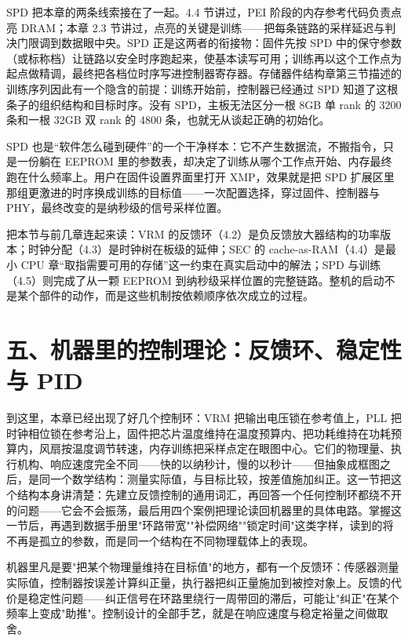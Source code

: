 SPD 把本章的两条线索接在了一起。4.4 节讲过，PEI 阶段的内存参考代码负责点亮 DRAM；本章 2.3 节讲过，点亮的关键是训练——把每条链路的采样延迟与判决门限调到数据眼中央。SPD 正是这两者的衔接物：固件先按 SPD 中的保守参数（或标称档）让链路以安全时序跑起来，使基本读写可用；训练再以这个工作点为起点做精调，最终把各档位时序写进控制器寄存器。存储器件结构章第三节描述的训练序列因此有一个隐含的前提：训练开始前，控制器已经通过 SPD 知道了这根条子的组织结构和目标时序。没有 SPD，主板无法区分一根 8GB 单 rank 的 3200 条和一根 32GB 双 rank 的 4800 条，也就无从谈起正确的初始化。

SPD 也是“软件怎么碰到硬件”的一个干净样本：它不产生数据流，不搬指令，只是一份躺在 EEPROM 里的参数表，却决定了训练从哪个工作点开始、内存最终跑在什么频率上。用户在固件设置界面里打开 XMP，效果就是把 SPD 扩展区里那组更激进的时序换成训练的目标值——一次配置选择，穿过固件、控制器与 PHY，最终改变的是纳秒级的信号采样位置。

\begin{classicnote}
把本节与前几章连起来读：VRM 的反馈环（4.2）是负反馈放大器结构的功率版本；时钟分配（4.3）是时钟树在板级的延伸；SEC 的 cache-as-RAM（4.4）是最小 CPU 章“取指需要可用的存储”这一约束在真实启动中的解法；SPD 与训练（4.5）则完成了从一颗 EEPROM 到纳秒级采样位置的完整链路。整机的启动不是某个部件的动作，而是这些机制按依赖顺序依次成立的过程。
\end{classicnote}
\section{五、机器里的控制理论：反馈环、稳定性与 PID}

到这里，本章已经出现了好几个控制环：VRM 把输出电压锁在参考值上，PLL 把时钟相位锁在参考沿上，固件把芯片温度维持在温度预算内、把功耗维持在功耗预算内，风扇按温度调节转速，内存训练把采样点定在眼图中心。它们的物理量、执行机构、响应速度完全不同——快的以纳秒计，慢的以秒计——但抽象成框图之后，是同一个数学结构：测量实际值，与目标比较，按差值施加纠正。这一节把这个结构本身讲清楚：先建立反馈控制的通用词汇，再回答一个任何控制环都绕不开的问题——它会不会振荡，最后用四个案例把理论读回机器里的具体电路。掌握这一节后，再遇到数据手册里"环路带宽""补偿网络""锁定时间"这类字样，读到的将不再是孤立的参数，而是同一个结构在不同物理载体上的表现。

\begin{keyidea}
机器里凡是要"把某个物理量维持在目标值"的地方，都有一个反馈环：传感器测量实际值，控制器按误差计算纠正量，执行器把纠正量施加到被控对象上。反馈的代价是稳定性问题——纠正信号在环路里绕行一周带回的滞后，可能让"纠正"在某个频率上变成"助推"。控制设计的全部手艺，就是在响应速度与稳定裕量之间做取舍。
\end{keyidea}

